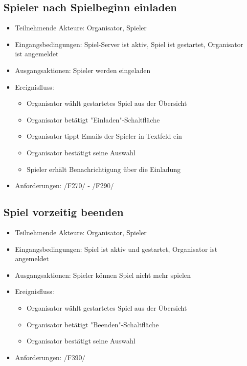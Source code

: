 \documentclass[a4paper]{scrreprt}
\begin{document}
    \subsection{Spieler nach Spielbeginn einladen}
    \begin{itemize}
        \item Teilnehmende Akteure: \Gls{Organisator}, \Gls{Spieler}
        \item Eingangsbedingungen: \Gls{Spiel-Server} ist aktiv, \Gls{Spiel} ist gestartet, \Gls{Organisator} ist angemeldet
        \item Ausgangsaktionen: \Gls{Spieler} werden eingeladen
        \item Ereignisfluss:
        \begin{itemize}
            \item \Gls{Organisator} wählt gestartetes \Gls{Spiel} aus der Übersicht
            \item \Gls{Organisator} betätigt "Einladen"-Schaltfläche
            \item \Gls{Organisator} tippt Emails der \Gls{Spieler} in Textfeld ein
            \item \Gls{Organisator} bestätigt seine Auswahl
            \item \Gls{Spieler} erhält Benachrichtigung über die Einladung
        \end{itemize}
        \item Anforderungen: /F270/ - /F290/ 
    \end{itemize}

    \subsection{Spiel vorzeitig beenden}
    \begin{itemize}
        \item Teilnehmende Akteure: \Gls{Organisator}, \Gls{Spieler}
        \item Eingangsbedingungen: \Gls{Spiel} ist aktiv und gestartet, \Gls{Organisator} ist angemeldet
        \item Ausgangsaktionen: \Gls{Spieler} können \Gls{Spiel} nicht mehr spielen %
        \item Ereignisfluss:
        \begin{itemize}
            \item \Gls{Organisator} wählt gestartetes \Gls{Spiel} aus der Übersicht
            \item \Gls{Organisator} betätigt "Beenden"-Schaltfläche
            \item \Gls{Organisator} bestätigt seine Auswahl
        \end{itemize}
        \item Anforderungen: /F390/
    \end{itemize}
\end{document}
